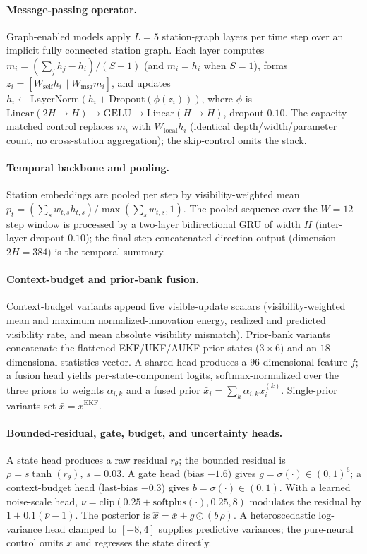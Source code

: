 \documentclass{article}
\begin{document}
\paragraph{Message-passing operator.}
Graph-enabled models apply \(L=5\) station-graph layers per time step over an implicit fully connected station graph. Each layer computes \(m_i=(\sum_j h_j - h_i)/(S-1)\) (and \(m_i=h_i\) when \(S=1\)), forms \(z_i=[W_{\mathrm{self}}h_i\;\Vert\;W_{\mathrm{msg}}m_i]\), and updates \(h_i\leftarrow\mathrm{LayerNorm}(h_i+\mathrm{Dropout}(\phi(z_i)))\), where \(\phi\) is \(\mathrm{Linear}(2H\!\to\!H)\to\mathrm{GELU}\to\mathrm{Linear}(H\!\to\!H)\), dropout \(0.10\). The capacity-matched control replaces \(m_i\) with \(W_{\mathrm{local}}h_i\) (identical depth/width/parameter count, no cross-station aggregation); the skip-control omits the stack.

\paragraph{Temporal backbone and pooling.}
Station embeddings are pooled per step by visibility-weighted mean \(p_t=(\sum_s w_{t,s}h_{t,s})/\max(\sum_s w_{t,s},1)\). The pooled sequence over the \(W=12\)-step window is processed by a two-layer bidirectional GRU of width \(H\) (inter-layer dropout \(0.10\)); the final-step concatenated-direction output (dimension \(2H=384\)) is the temporal summary.

\paragraph{Context-budget and prior-bank fusion.}
Context-budget variants append five visible-update scalars (visibility-weighted mean and maximum normalized-innovation energy, realized and predicted visibility rate, and mean absolute visibility mismatch). Prior-bank variants concatenate the flattened EKF/UKF/AUKF prior states (\(3\times6\)) and an \(18\)-dimensional statistics vector. A shared head produces a \(96\)-dimensional feature \(f\); a fusion head yields per-state-component logits, softmax-normalized over the three priors to weights \(\alpha_{i,k}\) and a fused prior \(\bar{x}_i=\sum_k\alpha_{i,k}x^{(k)}_i\). Single-prior variants set \(\bar{x}=x^{\mathrm{EKF}}\).

\paragraph{Bounded-residual, gate, budget, and uncertainty heads.}
A state head produces a raw residual \(r_\theta\); the bounded residual is \(\rho=s\tanh(r_\theta)\), \(s=0.03\). A gate head (bias \(-1.6\)) gives \(g=\sigma(\cdot)\in(0,1)^6\); a context-budget head (last-bias \(-0.3\)) gives \(b=\sigma(\cdot)\in(0,1)\). With a learned noise-scale head, \(\nu=\mathrm{clip}(0.25+\mathrm{softplus}(\cdot),0.25,8)\) modulates the residual by \(1+0.1(\bar\nu-1)\). The posterior is \(\hat{x}=\bar{x}+g\odot(b\,\rho)\). A heteroscedastic log-variance head clamped to \([-8,4]\) supplies predictive variances; the pure-neural control omits \(\bar{x}\) and regresses the state directly.
\end{document}
